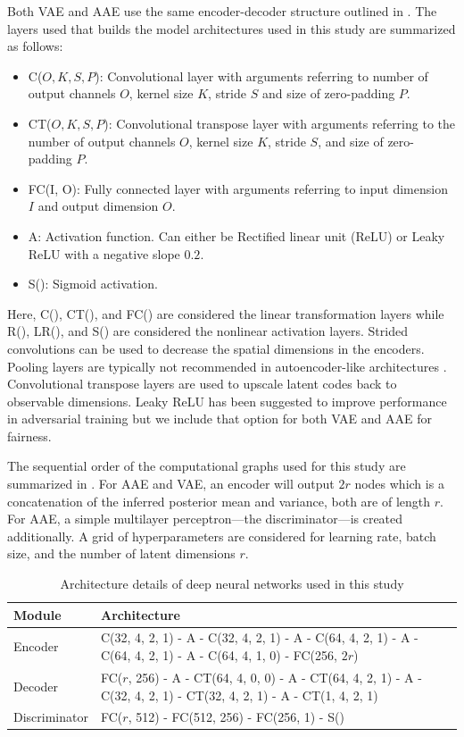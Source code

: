 \documentclass{scrartcl}
\theoremstyle{definition}
\let\ref\Cref
\begin{document}
Both VAE and AAE use the same encoder-decoder structure outlined in \ref{tab:model-architectures}.
The layers used that builds the model architectures used in this study are summarized as follows:
 
\begin{itemize}
	\item C($O, K, S, P$): Convolutional layer with arguments referring to number of output channels $O$, kernel size $K$, stride $S$ and size of zero-padding $P$.
	\item CT($O, K, S, P$): Convolutional transpose layer with arguments referring to the number of output channels $O$, kernel size $K$, stride $S$, and size of zero-padding $P$.
	\item FC(I, O): Fully connected layer with arguments referring to input dimension $I$ and output dimension $O$.
	\item A: Activation function. Can either be Rectified linear unit (ReLU) or Leaky ReLU with a negative slope $0.2$.
	\item S(): Sigmoid activation.
\end{itemize}
Here, C(), CT(), and FC() are considered the linear transformation layers while R(), LR(), and S() are considered the nonlinear activation layers. 
Strided convolutions can be used to decrease the spatial dimensions in the encoders. 
Pooling layers are typically not recommended in autoencoder-like architectures \parencite{radford2015unsupervised}. 
Convolutional transpose layers are used to upscale latent codes back to observable dimensions. 
Leaky ReLU has been suggested to improve performance in adversarial training \parencite{salimans2016improved} but we include that option for both VAE and AAE for fairness.

The sequential order of the computational graphs used for this study are summarized in \ref{tab:model-architectures}. 
For AAE and VAE, an encoder will output $2r$ nodes which is a concatenation of the inferred posterior mean and variance, both are of length $r$. 
For AAE, a simple multilayer perceptron---the discriminator---is created additionally.  
A grid of hyperparameters are considered for learning rate, batch size, and the number of latent dimensions $r$.

\begin{table}[!t]
	\renewcommand{\arraystretch}{1.3}
	\caption{Architecture details of deep neural networks used in this study}
	\label{tab:model-architectures}
	
	\begin{tabular}{ll}
		\toprule
		Module & Architecture \\
		\midrule
		Encoder & C(32, 4, 2, 1) - A - C(32, 4, 2, 1) - A - C(64, 4, 2, 1) - A - C(64, 4, 2, 1) - A - C(64, 4, 1, 0) - FC(256, $2r$) \\
		Decoder & FC($r$, 256) - A - CT(64, 4, 0, 0) - A - CT(64, 4, 2, 1) - A - C(32, 4, 2, 1) - CT(32, 4, 2, 1) - A - CT(1, 4, 2, 1) \\ 
		Discriminator & FC($r$, 512) - FC(512, 256) - FC(256, 1) - S() \\
		\bottomrule
	\end{tabular}
\end{table}
\end{document}
